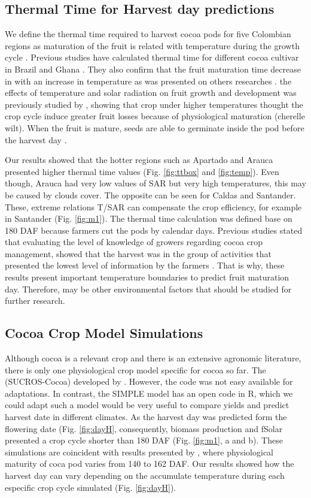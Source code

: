 \documentclass[gene,journal,article,submit,moreauthors,pdftex]{Definitions/mdpi}
\begin{document}
\subsection{Thermal Time for Harvest day predictions}
We define the thermal time required to harvest cocoa pods for five Colombian regions as maturation of the fruit is related with temperature during the growth cycle \citep{lopez2018}. Previous studies have calculated thermal time for  different cocoa cultivar in Brazil and Ghana \cite{Daymond2008}. They also confirm that the fruit maturation time decrease in with an increase in temperature as was presented on others researches \citep{Alvim1974, End1991, Daymond2008}. the effects of temperature and solar radiation on fruit growth and development was previously studied by \cite{Daymond2008}, showing that crop under higher temperatures thought the crop cycle induce greater fruit losses because of physiological maturation (cherelle wilt). When the fruit is mature, seeds are able to germinate inside the pod before the harvest day \citep{lopez2018}.

Our results showed that the hotter regions such as Apartado and Arauca presented higher thermal time values (Fig. \ref{fig:ttbox} and \ref{fig:temp}). Even though, Arauca had very low values of SAR but very high temperatures, this may be caused by clouds cover. The opposite can be seen for Caldas and Santander. These, extreme relations T/SAR can compensate the crop efficiency, for example in Santander (Fig. \ref{fig:m1}).  The thermal time calculation was defined base on  180 DAF because farmers cut the pods by calendar days. Previous studies stated that evaluating the level of knowledge of growers regarding cocoa crop management, showed that the harvest was in the group of activities that presented the lowest level of information by the farmers \citep{Gutierrez2020}. That is why, these results present important temperature boundaries to predict fruit maturation day. Therefore, may be other environmental factors that should be studied for further research. 

\subsection{Cocoa Crop Model Simulations}
Although cocoa is a relevant crop and there is an extensive agronomic literature, there is only one physiological crop model specific for cocoa so far. The (SUCROS-Cocoa) developed by \cite{zuidema2005}. However, the code was not easy available for adaptations. In contrast, the SIMPLE model has an open code in R, which we could adapt such a model would be very useful to compare yields and predict harvest date in different climates. As the harvest day was predicted form the flowering date (Fig. \ref{fig:dayH}, consequently, biomass production and fSolar presented a crop cycle shorter than 180 DAF (Fig. \ref{fig:m1}, a and b). These simulations are coincident with results presented by \cite{lopez2018}, where physiological maturity of coca pod varies from 140 to 162 DAF.  Our results showed how the harvest day can vary depending on the accumulate temperature during each especific crop cycle simulated (Fig. \ref{fig:dayH}).
\end{document}
